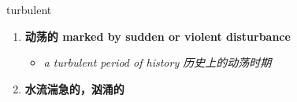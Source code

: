 
\begin{frame}
{\huge turbulent}
\begin{center}
\begin{enumerate}\Large
  \item \textbf{动荡的 marked by sudden or violent disturbance}
  \begin{itemize}
    \item \em{\Large{a turbulent period of history 历史上的动荡时期}}
  \end{itemize}
  \item \textbf{水流湍急的，汹涌的}
\end{enumerate}
\end{center}
\end{frame}
